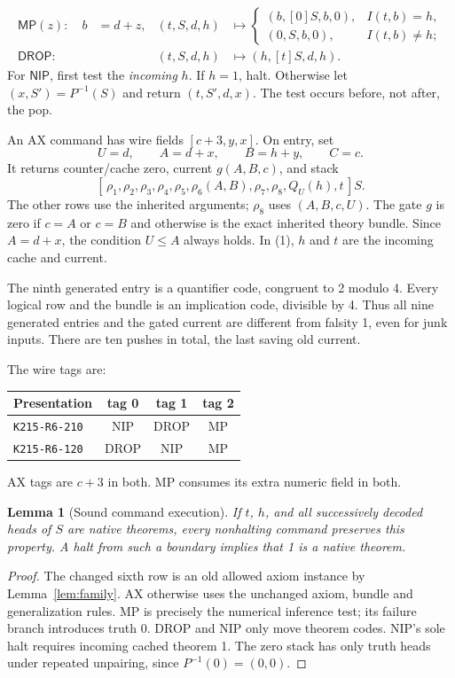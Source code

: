 \documentclass[11pt,a4paper]{article}
\newtheorem{lemma}[theorem]{Lemma}
\theoremstyle{remark}\newtheorem{remark}[theorem]{Remark}
\newcommand{\MP}{\mathsf{MP}}
\newcommand{\DROP}{\mathsf{DROP}}
\newcommand{\NIP}{\mathsf{NIP}}
\newcommand{\rhoa}{\texttt{K215-R6-210}}
\newcommand{\rhob}{\texttt{K215-R6-120}}
\begin{document}
\begin{align*}
\MP(z):\quad b&=d+z,&
(t,S,d,h)&\longmapsto
 \begin{cases}
 (b,[0]S,b,0),&I(t,b)=h,\\
 (0,S,b,0),&I(t,b)\ne h;
 \end{cases}\\
\DROP:\quad &&
(t,S,d,h)&\longmapsto(h,[t]S,d,h).
\end{align*}
For $\NIP$, first test the \emph{incoming} $h$. If $h=1$, halt.
Otherwise let $(x,S')=P^{-1}(S)$ and return $(t,S',d,x)$.
The test occurs before, not after, the pop.

An AX command has wire fields $[c+3,y,x]$. On entry, set
\[
 U=d,\qquad A=d+x,\qquad B=h+y,\qquad C=c.
\]
It returns counter/cache zero, current $g(A,B,c)$, and stack
\[
 [\,\rho_1,\rho_2,\rho_3,\rho_4,\rho_5,
       \rho_6(A,B),\rho_7,\rho_8,Q_U(h),t\,]S.       \tag{1}
\]
The other rows use the inherited arguments; $\rho_8$ uses $(A,B,c,U)$.
The gate $g$ is zero if $c=A$ or $c=B$ and otherwise is the exact
inherited theory bundle. Since $A=d+x$, the condition $U\le A$
always holds. In (1), $h$ and $t$ are the incoming cache and current.

The ninth generated entry is a quantifier code, congruent to 2 modulo 4.
Every logical row and the bundle is an implication code, divisible by 4.
Thus all nine generated entries and the gated current are different
from falsity 1, even for junk inputs. There are ten pushes in total,
the last saving old current.

The wire tags are:
\begin{center}
\begin{tabular}{@{}lccc@{}}
\toprule
Presentation & tag 0 & tag 1 & tag 2\\
\midrule
\rhoa & NIP & DROP & MP\\
\rhob & DROP & NIP & MP\\
\bottomrule
\end{tabular}
\end{center}
AX tags are $c+3$ in both. MP consumes its extra numeric field in both.

\begin{lemma}[Sound command execution]\label{lem:sound}
If $t$, $h$, and all successively decoded heads of $S$ are native
theorems, every nonhalting command preserves this property.
A halt from such a boundary implies that 1 is a native theorem.
\end{lemma}
\begin{proof}
The changed sixth row is an old allowed axiom instance by
Lemma~\ref{lem:family}. AX otherwise uses the unchanged axiom,
bundle and generalization rules. MP is precisely the numerical inference
test; its failure branch introduces truth 0. DROP and NIP only move
theorem codes. NIP's sole halt requires incoming cached theorem 1.
The zero stack has only truth heads under repeated unpairing, since
$P^{-1}(0)=(0,0)$.
\end{proof}
\end{document}
